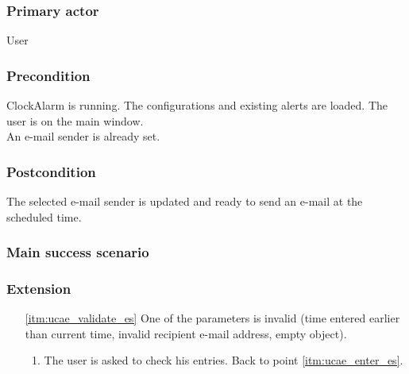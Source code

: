 \subsubsection{Primary actor}
User
\subsubsection{Precondition}
ClockAlarm is running. The configurations and existing alerts are loaded. The user is on the main window.
\\An e-mail sender is already set.
\subsubsection{Postcondition}
The selected e-mail sender is updated and ready to send an e-mail at the scheduled time.
\subsubsection{Main success scenario}
\subsubsection{Extension}
\begin{enumerate}
	\item[\ref{itm:ucae_validate_es}] One of the parameters is invalid (time entered earlier than current time, invalid recipient e-mail address, empty object).
	\begin{enumerate}[i]
		\item The user is asked to check his entries. Back to point \ref{itm:ucae_enter_es}.
	\end{enumerate}
\end{enumerate}